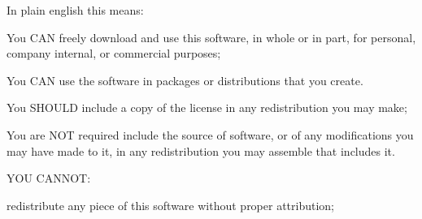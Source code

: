 In plain english this means\-:

You C\-A\-N freely download and use this software, in whole or in part, for personal, company internal, or commercial purposes;

You C\-A\-N use the software in packages or distributions that you create.

You S\-H\-O\-U\-L\-D include a copy of the license in any redistribution you may make;

You are N\-O\-T required include the source of software, or of any modifications you may have made to it, in any redistribution you may assemble that includes it.

Y\-O\-U C\-A\-N\-N\-O\-T\-:

redistribute any piece of this software without proper attribution; 